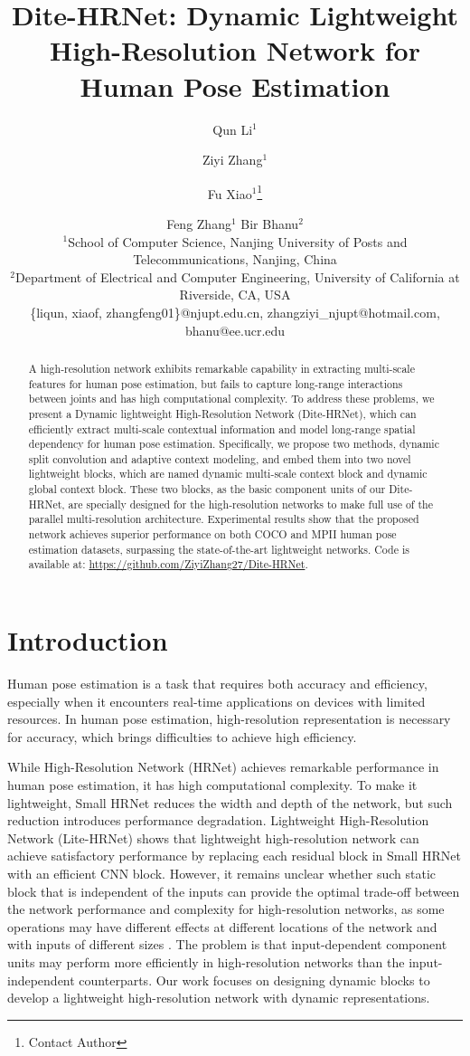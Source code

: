 \documentclass{article}
\title{Dite-HRNet: Dynamic Lightweight High-Resolution Network for Human Pose Estimation}
\author{
Qun Li$^1$\and
Ziyi Zhang$^1$\and
Fu Xiao$^1$\footnote{Contact Author}\and
Feng Zhang$^1$\And
Bir Bhanu$^2$\\ 
\affiliations
$^1$School of Computer Science, Nanjing University of Posts and Telecommunications, Nanjing, China\\ 
$^2$Department of Electrical and Computer Engineering, University of California at Riverside, CA, USA\\
\emails
\{liqun, xiaof, zhangfeng01\}@njupt.edu.cn,
zhangziyi\_njupt@hotmail.com,
bhanu@ee.ucr.edu
}
\begin{document}
\maketitle

\begin{abstract}
A high-resolution network exhibits remarkable capability in extracting multi-scale features for human pose estimation, but fails to capture long-range interactions between joints and has high computational complexity. To address these problems, we present a Dynamic lightweight High-Resolution Network (Dite-HRNet), which can efficiently extract multi-scale contextual information and model long-range spatial dependency for human pose estimation. Specifically, we propose two methods, dynamic split convolution and adaptive context modeling, and embed them into two novel lightweight blocks, which are named dynamic multi-scale context block and dynamic global context block. These two blocks, as the basic component units of our Dite-HRNet, are specially designed for the high-resolution networks to make full use of the parallel multi-resolution architecture. Experimental results show that the proposed network achieves superior performance on both COCO and MPII human pose estimation datasets, surpassing the state-of-the-art lightweight networks. Code is available at: \url{https://github.com/ZiyiZhang27/Dite-HRNet}.
\end{abstract}

\section{Introduction}
Human pose estimation is a task that requires both accuracy and efficiency, especially when it encounters real-time applications on devices with limited resources. In human pose estimation, high-resolution representation is necessary for accuracy, which brings difficulties to achieve high efficiency. 

While High-Resolution Network (HRNet) \cite{sun:hrnet} achieves remarkable performance in human pose estimation, it has high computational complexity. To make it lightweight, Small HRNet \cite{wang:smallhrnet} reduces the width and depth of the network, but such reduction introduces performance degradation. Lightweight High-Resolution Network (Lite-HRNet) \cite{yu:litehrnet} shows that lightweight high-resolution network can achieve satisfactory performance by replacing each residual block in Small HRNet with an efficient CNN block. However, it remains unclear whether such static block that is independent of the inputs can provide the optimal trade-off between the network performance and complexity for high-resolution networks, as some operations may have different effects at different locations of the network and with inputs of different sizes \cite{cui:pplcnet}. The problem is that input-dependent component units may perform more efficiently in high-resolution networks than the input-independent counterparts. Our work focuses on designing dynamic blocks to develop a lightweight high-resolution network with dynamic representations.
\end{document}
